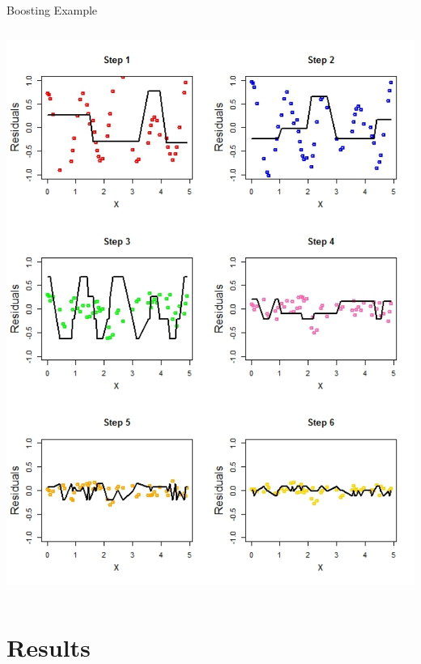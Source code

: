 \documentclass{beamer}
\begin{document}
\begin{frame}{Boosting Example}
\begin{columns}
\begin{column}{0.6\textwidth}
				\includegraphics[scale=0.365]{boostex.jpeg}
			\end{column}
		\end{columns}
	\end{frame}
	
	\section{Results}
	
\end{document}
